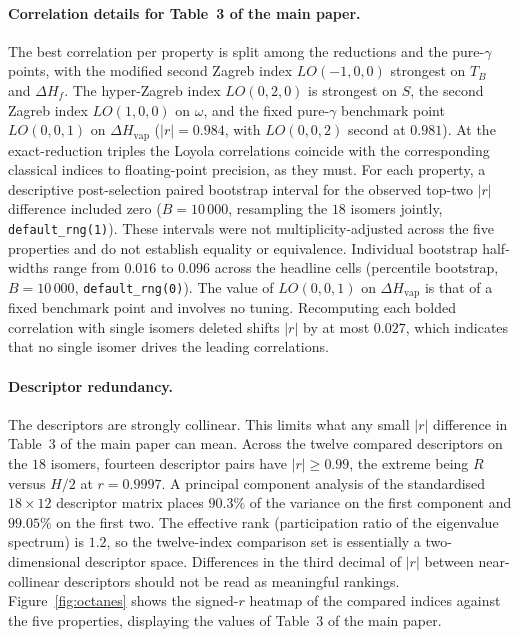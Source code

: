\documentclass[a5paper, 10pt]{article}
\theoremstyle{plain}
\theoremstyle{remark}
\theoremstyle{definition}
\begin{document}
\paragraph{Correlation details for Table~3 of the main paper.}
The best correlation per property is split among the reductions and
the pure-$\gamma$ points, with the modified second Zagreb index
$LO(-1, 0, 0)$ strongest on $T_B$ and $\Delta H_f$. The
hyper-Zagreb index $LO(0, 2, 0)$ is strongest on $S$, the second
Zagreb index $LO(1, 0, 0)$ on $\omega$, and the fixed pure-$\gamma$
benchmark point $LO(0, 0, 1)$ on $\Delta H_{\mathrm{vap}}$
($|r| = 0.984$, with $LO(0, 0, 2)$ second at $0.981$). At the
exact-reduction triples the Loyola correlations coincide with the
corresponding classical indices to floating-point precision, as they
must. For each property, a descriptive post-selection paired bootstrap
interval for the observed top-two $|r|$ difference included zero
($B = 10\,000$, resampling the $18$ isomers jointly,
\texttt{default\_rng(1)}). These intervals were not
multiplicity-adjusted across the five properties and do not establish
equality or equivalence. Individual bootstrap half-widths range from
$0.016$ to $0.096$ across the headline cells (percentile bootstrap,
$B = 10\,000$, \texttt{default\_rng(0)}). The value of $LO(0, 0, 1)$ on
$\Delta H_{\mathrm{vap}}$ is that of a fixed benchmark point and
involves no tuning. Recomputing each bolded correlation with single
isomers deleted shifts $|r|$ by at most $0.027$, which indicates that no
single isomer drives the leading correlations.

\paragraph{Descriptor redundancy.} The descriptors are strongly
collinear. This limits what any small $|r|$ difference in
Table~3 of the main paper can mean. Across the twelve compared
descriptors on the $18$ isomers, fourteen descriptor pairs have
$|r| \ge 0.99$, the extreme being $R$ versus $H/2$ at $r = 0.9997$. A
principal component analysis of the standardised $18 \times 12$
descriptor matrix places $90.3\%$ of the variance on the first
component and $99.05\%$ on the first two. The effective rank
(participation ratio of the eigenvalue spectrum) is $1.2$, so the
twelve-index comparison set is essentially a two-dimensional
descriptor space. Differences in the third decimal of $|r|$ between
near-collinear descriptors should not be read as meaningful rankings.
Figure~\ref{fig:octanes} shows the signed-$r$ heatmap of the compared
indices against the five properties, displaying the values of
Table~3 of the main paper.
\end{document}

